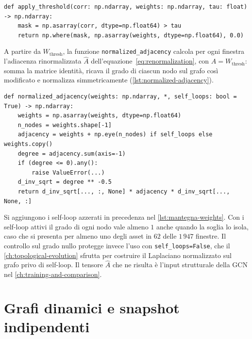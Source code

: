 \begin{listing}[H]
\begin{verbatim}
def apply_threshold(corr: np.ndarray, weights: np.ndarray, tau: float) -> np.ndarray:
    mask = np.asarray(corr, dtype=np.float64) > tau
    return np.where(mask, np.asarray(weights, dtype=np.float64), 0.0)
\end{verbatim}
\caption{\texttt{apply\_threshold}}
\label{lst:apply-threshold}
\end{listing}

A partire da $W_{\mathrm{thresh}}$, la funzione \texttt{normalized\_adjacency} calcola per ogni finestra l'adiacenza rinormalizzata $\hat A$ dell'equazione~\eqref{eq:renormalization}, con $A=W_{\mathrm{thresh}}$: somma la matrice identità, ricava il grado di ciascun nodo sul grafo così modificato e normalizza simmetricamente (\cref{lst:normalized-adjacency}).

\begin{listing}[H]
\begin{verbatim}
def normalized_adjacency(weights: np.ndarray, *, self_loops: bool = True) -> np.ndarray:
    weights = np.asarray(weights, dtype=np.float64)
    n_nodes = weights.shape[-1]
    adjacency = weights + np.eye(n_nodes) if self_loops else weights.copy()
    degree = adjacency.sum(axis=-1)
    if (degree <= 0).any():
        raise ValueError(...)
    d_inv_sqrt = degree ** -0.5
    return d_inv_sqrt[..., :, None] * adjacency * d_inv_sqrt[..., None, :]
\end{verbatim}
\caption{\texttt{normalized\_adjacency}}
\label{lst:normalized-adjacency}
\end{listing}

Si aggiungono i self-loop azzerati in precedenza nel \cref{lst:mantegna-weights}. Con i self-loop attivi il grado di ogni nodo vale almeno $1$ anche quando la soglia lo isola, caso che si presenta per almeno uno degli asset in $62$ delle $1\,947$ finestre. Il controllo sul grado nullo protegge invece l'uso con \texttt{self\_loops=False}, che il \cref{ch:topological-evolution} sfrutta per costruire il Laplaciano normalizzato sul grafo privo di self-loop. Il tensore $\hat A$ che ne risulta è l'input strutturale della GCN nel \cref{ch:training-and-comparison}.

\section{Grafi dinamici e snapshot indipendenti}
\label{sec:dynamic-graphs-temporal-question}

